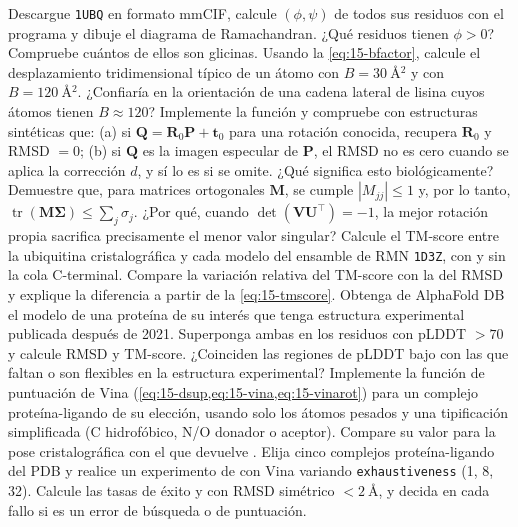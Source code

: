 \begin{ejercicios}
 Descargue \texttt{1UBQ} en formato mmCIF, calcule $(\phi,\psi)$ de todos sus residuos con el programa  y dibuje el diagrama de Ramachandran. ¿Qué residuos tienen $\phi>0$? Compruebe cuántos de ellos son glicinas.
 Usando la \cref{eq:15-bfactor}, calcule el desplazamiento tridimensional típico de un átomo con $B=\SI{30}{\angstrom^2}$ y con $B=\SI{120}{\angstrom^2}$. ¿Confiaría en la orientación de una cadena lateral de lisina cuyos átomos tienen $B\approx120$?
 Implemente la función  y compruebe con estructuras sintéticas que: (a) si $\mathbf Q=\mathbf R_0\mathbf P+\mathbf t_0$ para una rotación conocida, recupera $\mathbf R_0$ y RMSD $=0$; (b) si $\mathbf Q$ es la imagen especular de $\mathbf P$, el RMSD no es cero cuando se aplica la corrección $d$, y sí lo es si se omite. ¿Qué significa esto biológicamente?
 Demuestre que, para matrices ortogonales $\mathbf M$, se cumple $|M_{jj}|\le1$ y, por lo tanto, $\operatorname{tr}(\mathbf M\boldsymbol\Sigma)\le\sum_j\sigma_j$. ¿Por qué, cuando $\det(\mathbf V\mathbf U^\top)=-1$, la mejor rotación propia sacrifica precisamente el menor valor singular?
 Calcule el TM-score entre la ubiquitina cristalográfica y cada modelo del ensamble de RMN \texttt{1D3Z}, con y sin la cola C-terminal. Compare la variación relativa del TM-score con la del RMSD y explique la diferencia a partir de la \cref{eq:15-tmscore}.
 Obtenga de AlphaFold DB el modelo de una proteína de su interés que tenga estructura experimental publicada después de 2021. Superponga ambas en los residuos con pLDDT $>70$ y calcule RMSD y TM-score. ¿Coinciden las regiones de pLDDT bajo con las que faltan o son flexibles en la estructura experimental?
 Implemente la función de puntuación de Vina (\cref{eq:15-dsup,eq:15-vina,eq:15-vinarot}) para un complejo proteína-ligando de su elección, usando solo los átomos pesados y una tipificación simplificada (C hidrofóbico, N/O donador o aceptor). Compare su valor para la pose cristalográfica con el que devuelve .
 Elija cinco complejos proteína-ligando del PDB y realice un experimento de  con Vina variando \texttt{exhaustiveness} (1, 8, 32). Calcule las tasas de éxito  y  con RMSD simétrico $<\SI{2}{\angstrom}$, y decida en cada fallo si es un error de búsqueda o de puntuación.
\end{ejercicios}

